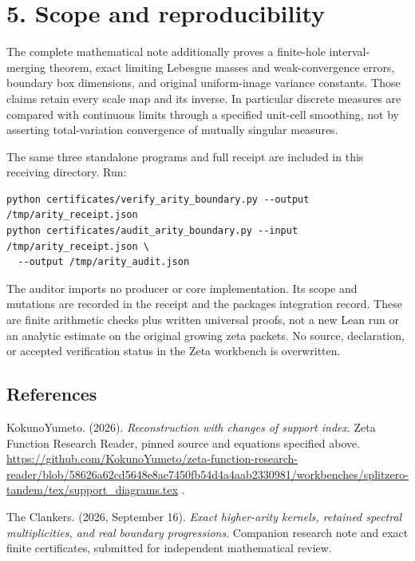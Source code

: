 \section{5. Scope and reproducibility}\label{n21-scope-and-reproducibility}

The complete mathematical note additionally proves a finite-hole interval-merging theorem, exact limiting Lebesgue masses and weak-convergence errors, boundary box dimensions, and original uniform-image variance constants. Those claims retain every scale map and its inverse. In particular discrete measures are compared with continuous limits through a specified unit-cell smoothing, not by asserting total-variation convergence of mutually singular measures.

The same three standalone programs and full receipt are included in this receiving directory. Run:

\begin{Verbatim}[breaklines=true,breakanywhere=true,fontsize=\footnotesize]
python certificates/verify_arity_boundary.py --output /tmp/arity_receipt.json
python certificates/audit_arity_boundary.py --input /tmp/arity_receipt.json \
  --output /tmp/arity_audit.json
\end{Verbatim}

The auditor imports no producer or core implementation. Its scope and mutations are recorded in the receipt and the package\textquotesingle s integration record. These are finite arithmetic checks plus written universal proofs, not a new Lean run or an analytic estimate on the original growing zeta packets. No source, declaration, or accepted verification status in the Zeta workbench is overwritten.

\subsection{References}\label{n21-references}

KokunoYumeto. (2026). \emph{Reconstruction with changes of support index}. Zeta Function Research Reader, pinned source and equations specified above. \url{https://github.com/KokunoYumeto/zeta-function-research-reader/blob/58626a62cd5648e8ae7450fb54d4a4aab2330981/workbenches/splitzero-tandem/tex/support_diagrams.tex} .

The Clankers. (2026, September 16). \emph{Exact higher-arity kernels, retained spectral multiplicities, and real boundary progressions}. Companion research note and exact finite certificates, submitted for independent mathematical review.
